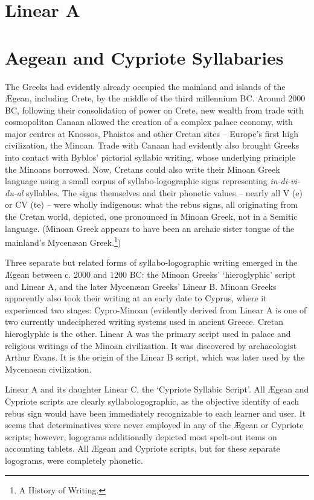 \section{Linear A}
\label{s:lineara}
\newfontfamily{}

\section{Aegean and Cypriote Syllabaries}

The Greeks had evidently already occupied the mainland and islands of the
Ægean, including Crete, by the middle of the third millennium
BC. Around 2000 BC, following their consolidation of power on
Crete, new wealth from trade with cosmopolitan Canaan
allowed the creation of a complex palace economy, with major
centres at Knossos, Phaistos and other Cretan sites – Europe’s
first high civilization, the Minoan. Trade with Canaan had evidently
also brought Greeks into contact with Byblos’ pictorial
syllabic writing, whose underlying principle the Minoans borrowed.
Now, Cretans could also write their Minoan Greek language
using a small corpus of syllabo-logographic signs
representing \textit{in-di-vi-du-al} syllables. The signs themselves and
their phonetic values – nearly all V (e) or CV (te) – were wholly
indigenous: what the rebus signs, all originating from the
Cretan world, depicted, one pronounced in Minoan Greek, not
in a Semitic language. (Minoan Greek appears to have been an
archaic sister tongue of the mainland’s Mycenæan Greek.\footnote{A History of Writing. })

Three separate but related forms of syllabo-logographic
writing emerged in the Ægean between c. 2000 and 1200 BC: the
Minoan Greeks’ ‘hieroglyphic’ script and Linear A, and the
later Mycenæan Greeks’ Linear B. Minoan Greeks apparently
also took their writing at an early date to Cyprus, where it experienced
two stages: Cypro-Minoan (evidently derived from
Linear A is one of two currently undeciphered writing systems used in ancient Greece. Cretan hieroglyphic is the other. Linear A was the primary script used in palace and religious writings of the Minoan civilization. It was discovered by archaeologist Arthur Evans. It is the origin of the Linear B script, which was later used by the Mycenaean civilization.

Linear A and its daughter Linear C, the ‘Cypriote Syllabic
Script’. All Ægean and Cypriote scripts are clearly syllabologographic,
as the objective identity of each rebus sign would
have been immediately recognizable to each learner and user. It
seems that determinatives were never employed in any of the
Ægean or Cypriote scripts; however, logograms additionally
depicted most spelt-out items on accounting tablets. All Ægean
and Cypriote scripts, but for these separate logograms, were
completely phonetic.
\medskip

